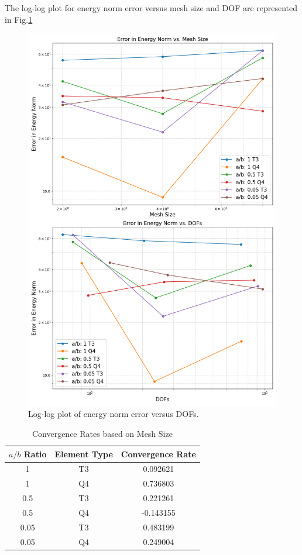 \documentclass[twoside,twocolumn,10pt]{article}
\begin{document}
The log-log plot for energy norm error versus mesh size and DOF are represented in Fig.\ref{fig:logDOF_Q2_4} 
\begin{figure}[!ht]
  \centering
  \includegraphics[width=1.\linewidth]{Q2_4/log_DOFs.png}
  \caption{Log-log plot of energy norm error versus DOFs.}
  \label{fig:logDOF_Q2_4}
\end{figure}
\begin{table}[ht]
  \centering
  \caption{Convergence Rates based on Mesh Size}
  \begin{tabular}{|c|c|c|}
  \hline
  \(a/b\) Ratio & Element Type & Convergence Rate \\
  \hline
  1 & T3 & 0.092621 \\
  1 & Q4 & 0.736803 \\
  0.5 & T3 & 0.221261 \\
  0.5 & Q4 & -0.143155 \\
  0.05 & T3 & 0.483199 \\
  0.05 & Q4 & 0.249004 \\
  \hline
  \end{tabular}
  \label{tab:convergenceRate_Meshsize}
\end{table}
\end{document}

